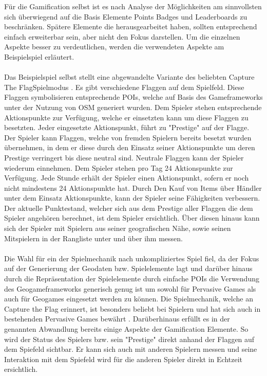 Für die Gamification selbst ist es nach Analyse der Möglichkeiten am sinnvollsten sich überwiegend auf die Basis Elemente Points Badges und Leaderboards zu beschränken. Spätere Elemente die \textcite{Zichermann.2011} herausgearbeitet haben, sollten entsprechend einfach erweiterbar sein, aber nicht den Fokus darstellen. Um die einzelnen Aspekte besser zu verdeutlichen, werden die verwendeten Aspekte am Beispielspiel erläutert.
\\\\
Das Beispielspiel selbst stellt eine abgewandelte Variante des beliebten Capture The FlagSpielmodus \cite{Atkin.1999}.
Es gibt verschiedene Flaggen auf dem Spielfeld. Diese Flaggen symbolisieren entsprechende POIs, welche auf Basis des Gameframeworks unter der Nutzung von OSM generiert wurden. Dem Spieler stehen entsprechende Aktionspunkte zur Verfügung, welche er einsetzten kann um diese Flaggen zu besetzten. Jeder eingesetzte Aktionspunkt, führt zu "Prestige" auf der Flagge. Der Spieler kann Flaggen, welche von fremden Spielern bereits besetzt wurden übernehmen, in dem er diese durch den Einsatz seiner Aktionspunkte um deren Prestige verringert bis diese neutral sind. Neutrale Flaggen kann der Spieler wiederum einnehmen. Dem Spieler stehen pro Tag 24 Aktionspunkte zur Verfügung. Jede Stunde erhält der Spieler einen Aktionspunkt, sofern er noch nicht mindestens 24 Aktionspunkte hat. Durch Den Kauf von Items über Händler unter dem Einsatz Aktionspunkte, kann der Spieler seine Fähigkeiten verbessern. Der aktuelle Punktestand, welcher sich aus dem Prestige aller Flaggen die dem Spieler angehören berechnet, ist dem Spieler ersichtlich. Über diesen hinaus kann sich der Spieler mit Spielern aus seiner geografischen Nähe, sowie seinen Mitspielern in der Rangliste unter und über ihm messen.
\\\\
Die Wahl für ein der Spielmechanik nach unkompliziertes Spiel fiel, da der Fokus auf der Generierung der Geodaten bzw. Spielelemente lagt und darüber hinaus durch die Repräsentation der Spielelemente durch einfache POIs die Verwendung des Geogameframeworks generisch genug ist um sowohl für Pervasive Games als auch für Geogames eingesetzt werden zu können. Die Spielmechanik, welche an Capture the Flag erinnert, ist besonders beliebt bei Spielern und hat sich auch in bestehenden Pervasive Games bewährt \cite{Bell.2006,Ingress.2014}. Darüberhinaus erfüllt es in der genannten Abwandlung bereits einige Aspekte der Gamification Elemente. So wird der Status des Spielers bzw. sein "Prestige" direkt anhand der Flaggen auf dem Spiefeld sichtbar. Er kann sich auch mit anderen Spielern messen und seine Interaktion mit dem Spiefeld wird für die anderen Spieler direkt in Echtzeit ersichtlich.
